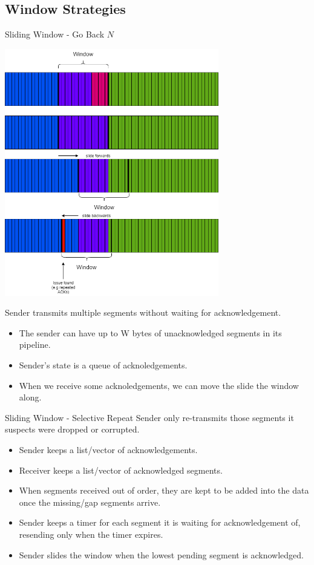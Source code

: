 \subsection{Window Strategies}
\begin{definitionbox}{Sliding Window - Go Back $N$}
    \begin{center}\includegraphics[width=0.7\textwidth]{transport_layer/images/sliding window go back N.png}\end{center}
    Sender transmits multiple segments without waiting for acknowledgement.
    \begin{itemize}
        \setlength\itemsep{0em}
        \item The sender can have up to W bytes of unacknowledged segments in its pipeline.
        \item Sender's state is a queue of acknoledgements.
        \item When we receive some acknoledgements, we can move the slide the window along.
    \end{itemize}
\end{definitionbox}
\begin{definitionbox}{Sliding Window - Selective Repeat}
    Sender only re-transmits those segments it suspects were dropped or corrupted.
    \begin{itemize}
        \setlength\itemsep{0em}
        \item Sender keeps a list/vector of acknowledgements.
        \item Receiver keeps a list/vector of acknowledged segments.
        \item When segments received out of order, they are kept to be added into the data once the missing/gap segments arrive.
        \item Sender keeps a timer for each segment it is waiting for acknowledgement of, resending only when the timer expires.
        \item Sender slides the window when the lowest pending segment is acknowledged.
    \end{itemize}
\end{definitionbox}
